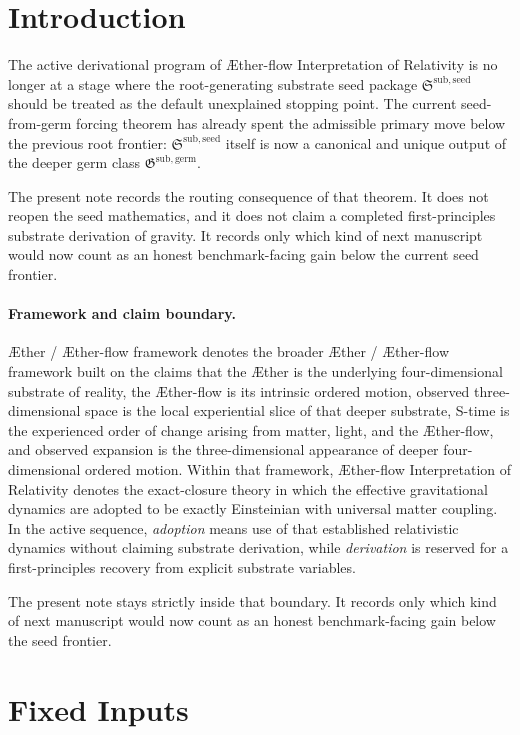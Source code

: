 \documentclass[11pt]{article}
\newcommand{\Aether}{\AE{}ther}
\newcommand{\Aflow}{\AE{}ther-flow}
\newcommand{\TheoryName}{\Aflow{} Interpretation of Relativity}
\newcommand{\TheoryProgram}{\Aether{} / \Aflow{} framework}
\newcommand{\SeedPackage}{\mathfrak S^{\mathrm{sub,seed}}}
\newcommand{\GermPackage}{\mathfrak G^{\mathrm{sub,germ}}}
\begin{document}
\section{Introduction}

The active derivational program of \TheoryName{} is no longer at a stage where the root-generating substrate seed package \(\SeedPackage\) should be treated as the default unexplained stopping point. The current seed-from-germ forcing theorem has already spent the admissible primary move below the previous root frontier: \(\SeedPackage\) itself is now a canonical and unique output of the deeper germ class \(\GermPackage\).

The present note records the routing consequence of that theorem. It does not reopen the seed mathematics, and it does not claim a completed first-principles substrate derivation of gravity. It records only which kind of next manuscript would now count as an honest benchmark-facing gain below the current seed frontier.

\paragraph{Framework and claim boundary.}
\TheoryProgram{} denotes the broader \Aether{} / \Aflow{} framework built on the claims that the \Aether{} is the underlying four-dimensional substrate of reality, the \Aflow{} is its intrinsic ordered motion, observed three-dimensional space is the local experiential slice of that deeper substrate, S-time is the experienced order of change arising from matter, light, and the \Aflow{}, and observed expansion is the three-dimensional appearance of deeper four-dimensional ordered motion. Within that framework, \TheoryName{} denotes the exact-closure theory in which the effective gravitational dynamics are adopted to be exactly Einsteinian with universal matter coupling. In the active sequence, \emph{adoption} means use of that established relativistic dynamics without claiming substrate derivation, while \emph{derivation} is reserved for a first-principles recovery from explicit substrate variables.

The present note stays strictly inside that boundary. It records only which kind of next manuscript would now count as an honest benchmark-facing gain below the seed frontier.

\section{Fixed Inputs}
\end{document}
